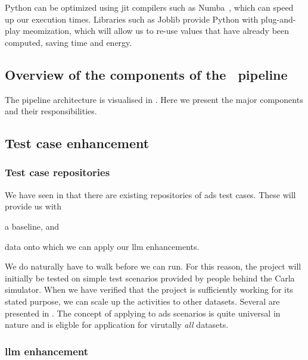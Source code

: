 Python can be optimized using \acrfull{jit} compilers such as Numba~\cite{numba}, which can speed up
our execution times. Libraries such as Joblib provide Python with plug-and-play
meomization, which will allow us to re-use values that have already been
computed, saving time and energy.


\subsection{Overview of the components of the \hefe~pipeline}

The pipeline architecture is visualised in . Here we
present the major components and their responsibilities.


\subsection*{Test case enhancement}

\subsubsection{Test case repositories}

We have seen in  that there are existing repositories of
\acrshort{ads} test cases. These will provide us with \begin{inparaenum}
    \item a baseline,
    and
    \item data onto which we can apply our \acrshort{llm} enhancements.
\end{inparaenum}

We do naturally have to walk before we can run. For this reason, the project will initially be
tested on simple test scenarios provided by people behind the Carla simulator. When we have verified
that the project is sufficiently working for its stated purpose, we can scale up the activities to
other datasets. Several are presented in . The concept of applying
 to \acrshort{ads} scenarios is quite universal in nature and is eligble for
application for virutally \emph{all} datasets.

\subsubsection{\acrshort{llm} enhancement}\label{sec:llmEnhancement}

